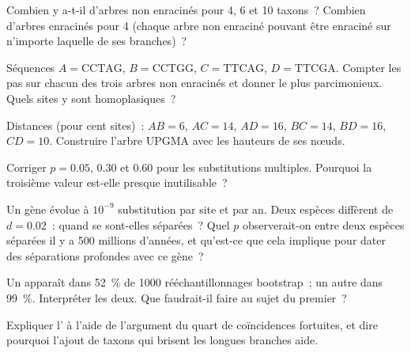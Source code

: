 \begin{exercise}[$\star$]\label{exo:b2:phylogenetic-trees:4}
Combien y a-t-il d'arbres non enracinés pour 4, 6 et 10 taxons~?
Combien d'arbres enracinés pour 4 (chaque arbre non enraciné pouvant être
enraciné sur n'importe laquelle de ses branches)~?
\end{exercise}

\begin{exercise}[$\star\star$]\label{exo:b2:phylogenetic-trees:5}
Séquences $A = \mathrm{CCTAG}$, $B = \mathrm{CCTGG}$, $C =
\mathrm{TTCAG}$, $D = \mathrm{TTCGA}$. Compter les pas sur chacun des
trois arbres non enracinés et donner le plus parcimonieux. Quels sites
y sont homoplasiques~?
\end{exercise}

\begin{exercise}[$\star\star$]\label{exo:b2:phylogenetic-trees:6}
Distances (pour cent sites)~: $AB = 6$, $AC = 14$, $AD = 16$,
$BC = 14$, $BD = 16$, $CD = 10$. Construire l'arbre UPGMA avec les
hauteurs de ses nœuds.
\end{exercise}

\begin{exercise}[$\star\star$]\label{exo:b2:phylogenetic-trees:7}
Corriger $p = 0.05$, $0.30$ et $0.60$ pour les substitutions multiples.
Pourquoi la troisième valeur est-elle presque inutilisable~?
\end{exercise}

\begin{exercise}[$\star\star$]\label{exo:b2:phylogenetic-trees:8}
Un gène évolue à $10^{-9}$ substitution par site et par an. Deux
espèces diffèrent de $d = 0.02$~: quand se sont-elles séparées~? Quel $p$
observerait-on entre deux espèces séparées il y a 500 millions d'années,
et qu'est-ce que cela implique pour dater des séparations profondes avec
ce gène~?
\end{exercise}

\begin{exercise}[$\star\star$]\label{exo:b2:phylogenetic-trees:9}
Un  apparaît dans \qty{52}{\%} de \num{1000} rééchantillonnages
bootstrap~; un autre dans \qty{99}{\%}. Interpréter les deux. Que
faudrait-il faire au sujet du premier~?
\end{exercise}

\begin{exercise}[$\star\star\star$]\label{exo:b2:phylogenetic-trees:10}
Expliquer l' à l'aide de l'argument du
quart de coïncidences fortuites, et dire pourquoi l'ajout de taxons qui
brisent les longues branches aide.
\end{exercise}

